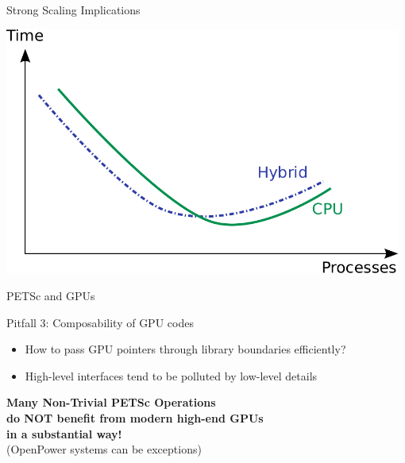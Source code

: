 \begin{frame}{Strong Scaling Implications}
\begin{center}
 \includegraphics[width=0.98\textwidth]{figures/strong-scaling-2}
\end{center}
\end{frame}



\begin{frame}{PETSc and GPUs}

  \begin{block}{Pitfall 3: Composability of GPU codes}
  \begin{itemize}
   \item How to pass GPU pointers through library boundaries efficiently?
   \item High-level interfaces tend to be polluted by low-level details
  \end{itemize}
  \end{block}


  \vspace*{1cm}
   \begin{center} \Large \textbf{Many Non-Trivial PETSc Operations \\[1em] do NOT benefit from modern high-end GPUs \\[1em] in a substantial way!}\\ \scriptsize (OpenPower systems can be exceptions) \end{center}
\end{frame}


